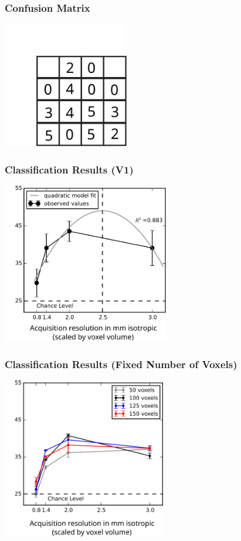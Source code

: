 \documentclass{beamer}
\begin{document}
  \begin{frame}
    \frametitle{Confusion Matrix}
        \begin{center}
            \includegraphics[height=5.5cm]{../pictures/confusion_matrix}
        \end{center}     
    \end{frame}  


  \begin{frame}
    \frametitle{Classification Results (V1)}
        \begin{center}
            \includegraphics[height=7cm]{../pictures/classification}
        \end{center}
    \end{frame}

    
  \begin{frame}
    \frametitle{Classification Results (Fixed Number of Voxels)}
        \begin{center}
            \includegraphics[height=7cm]{../pictures/fixed_voxels}
        \end{center}
    \end{frame}    
\end{document}

